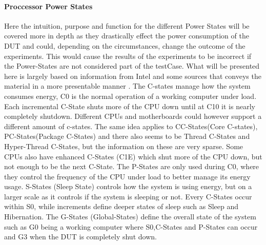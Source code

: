 \paragraph{Proccessor Power States}
Here the intuition, purpose and function for the different Power States will be covered more in depth as they drastically effect the power consumption of the DUT and could, depending on the circumstances, change the outcome of the experiments. This would cause the results of the experiments to be incorrect if the Power-States are not considered part of the testCase. What will be presented here is largely based on information from Intel\cite{CIntel} and some sources that conveys the material in a more presentable manner \cite{CMete,CLinux}. The C-states manage how the system consumes energy, C0 is the normal operation of a working computer under load. Each incremental C-State shuts more of the CPU down until at C10 it is nearly completely shutdown. Different CPUs and motherboards could however support a different amount of c-states. The same idea applies to CC-States(Core C-states), PC-States(Package C-States) and there also seems to be Thread C-States and Hyper-Thread C-States, but the information on these are very sparse. Some CPUs also have enhanced C-States (C1E) which shut more of the CPU down, but not enough to be the next C-State. The P-States are only used during C0, where they control the frequency of the CPU under load to better manage its energy usage. S-States (Sleep State) controls how the system is using energy, but on a larger scale as it controls if the system is sleeping or not. Every C-States occur within S0, while increments define deeper states of sleep such as Sleep and Hibernation. The G-States (Global-States) define the overall state of the system such as G0 being a working computer where S0,C-States and P-States can occur and G3 when the DUT is completely shut down.
